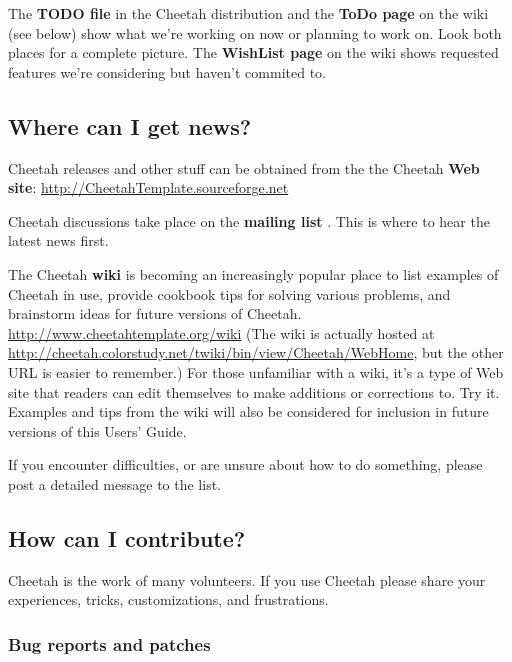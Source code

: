The {\bf TODO file} in the Cheetah distribution and the {\bf ToDo page} on the
wiki (see below) show what we're working on now or planning to work on.  Look
both places for a complete picture.  The {\bf WishList page} on the wiki shows
requested features we're considering but haven't commited to.

\subsection{Where can I get news?}
\label{intro.news}

Cheetah releases and other stuff can be obtained from the the Cheetah 
{\bf Web site}:
\url{http://CheetahTemplate.sourceforge.net}

Cheetah discussions take place on the {\bf mailing list}
.  This is where to hear
the latest news first.

The Cheetah {\bf wiki} is becoming an increasingly popular place to list
examples of Cheetah in use, provide cookbook tips for solving various problems,
and brainstorm ideas for future versions of Cheetah.
\url{http://www.cheetahtemplate.org/wiki}
(The wiki is actually hosted at
\url{http://cheetah.colorstudy.net/twiki/bin/view/Cheetah/WebHome}, but the 
other URL is easier to remember.)
For those unfamiliar with a wiki, it's a type of Web site that readers can edit
themselves to make additions or corrections to.  Try it.  Examples and tips 
from the wiki will also be considered for inclusion in future versions of this
Users' Guide.

If you encounter difficulties, or are unsure about how to do something,
please post a detailed message to the list.  

\subsection{How can I contribute?}
\label{intro.contribute}

Cheetah is the work of many volunteers.  If you use Cheetah please share your
experiences, tricks, customizations, and frustrations.

\subsubsection{Bug reports and patches}

